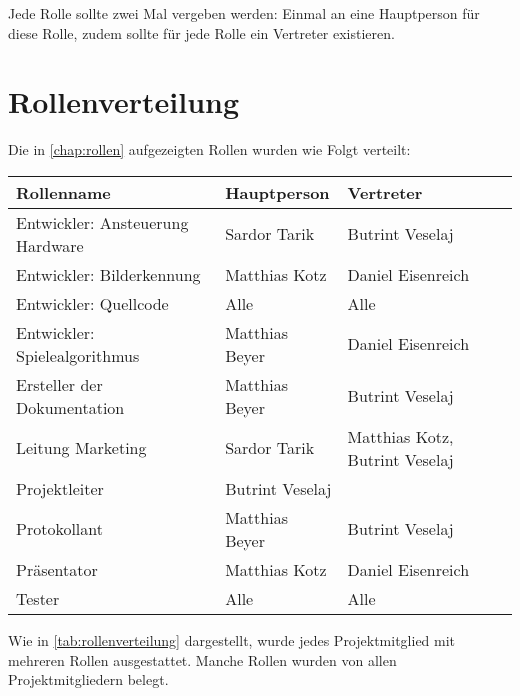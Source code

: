         Jede Rolle sollte zwei Mal vergeben werden: Einmal an eine Hauptperson
        für diese Rolle, zudem sollte für jede Rolle ein Vertreter existieren.

    \section{Rollenverteilung}

        Die in \autoref{chap:rollen} aufgezeigten Rollen wurden wie Folgt
        verteilt:

        \begin{center}
            \begin{tabular}{l | l | l }
                Rollenname                       & Hauptperson     & Vertreter \\

                \hline

                Entwickler: Ansteuerung Hardware & Sardor Tarik    & Butrint Veselaj \\
                Entwickler: Bilderkennung        & Matthias Kotz   & Daniel Eisenreich \\
                Entwickler: Quellcode            & Alle            & Alle \\
                Entwickler: Spielealgorithmus    & Matthias Beyer  & Daniel Eisenreich \\
                Ersteller der Dokumentation      & Matthias Beyer  & Butrint Veselaj \\
                Leitung Marketing                & Sardor Tarik    & Matthias Kotz, Butrint Veselaj \\
                Projektleiter                    & Butrint Veselaj & \\
                Protokollant                     & Matthias Beyer  & Butrint Veselaj \\
                Präsentator                      & Matthias Kotz   & Daniel Eisenreich \\
                Tester                           & Alle            & Alle \\
            \end{tabular}
            \label{tab:rollenverteilung}
        \end{center}

        Wie in \autoref{tab:rollenverteilung} dargestellt, wurde jedes
        Projektmitglied mit mehreren Rollen ausgestattet.
        Manche Rollen wurden von allen Projektmitgliedern belegt.

